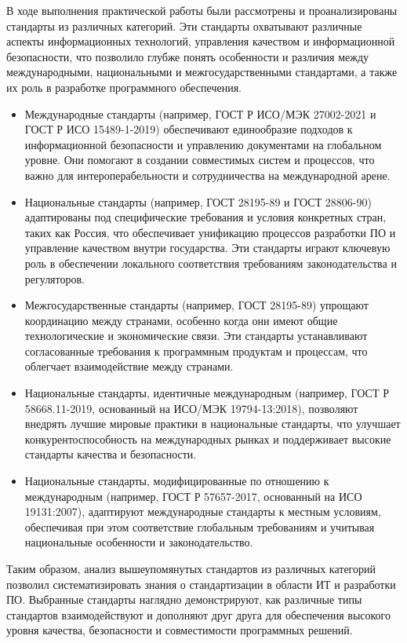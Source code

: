 В ходе выполнения практической работы были рассмотрены
и проанализированы стандарты из различных категорий.
Эти стандарты охватывают различные аспекты информационных технологий,
управления качеством и информационной безопасности,
что позволило глубже понять особенности и различия между международными,
национальными и межгосударственными стандартами,
а также их роль в разработке программного обеспечения.

\begin{itemize}
	\item Международные стандарты
		(например, ГОСТ Р ИСО/МЭК 27002-2021 и ГОСТ Р ИСО 15489-1-2019)
		обеспечивают единообразие подходов к информационной безопасности
		и управлению документами на глобальном уровне.
		Они помогают в создании совместимых систем и процессов, что важно
		для интероперабельности и сотрудничества на международной арене.
	\item Национальные стандарты (например, ГОСТ 28195-89 и ГОСТ 28806-90)
		адаптированы под специфические требования и условия конкретных стран,
		таких как Россия, что обеспечивает унификацию процессов разработки ПО
		и управление качеством внутри государства.
		Эти стандарты играют ключевую роль в обеспечении локального
		соответствия требованиям законодательства и регуляторов.
	\item Межгосударственные стандарты (например, ГОСТ 28195-89)
		упрощают координацию между странами, особенно когда они имеют
		общие технологические и экономические связи.
		Эти стандарты устанавливают согласованные требования
		к программным продуктам и процессам,
		что облегчает взаимодействие между странами.
	\item Национальные стандарты, идентичные международным
		(например, ГОСТ Р 58668.11-2019, основанный на ИСО/МЭК 19794-13:2018),
		позволяют внедрять лучшие мировые практики в национальные стандарты,
		что улучшает конкурентоспособность на международных рынках
		и поддерживает высокие стандарты качества и безопасности.
	\item Национальные стандарты, модифицированные по отношению к международным
		(например, ГОСТ Р 57657-2017, основанный на ИСО 19131:2007),
		адаптируют международные стандарты к местным условиям,
		обеспечивая при этом соответствие глобальным требованиям
		и учитывая национальные особенности и законодательство.
\end{itemize}

Таким образом, анализ вышеупомянутых стандартов
из различных категорий позволил систематизировать знания о стандартизации
в области ИТ и разработки ПО. Выбранные стандарты наглядно демонстрируют,
как различные типы стандартов взаимодействуют
и дополняют друг друга для обеспечения высокого уровня качества,
безопасности и совместимости программных решений.
